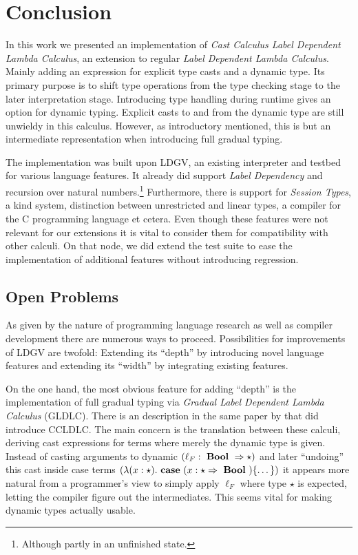 \chapter{Conclusion}\label{chap:conclusion}

In this work we presented an implementation of \emph{Cast Calculus Label Dependent Lambda Calculus}, an extension to regular \emph{Label Dependent Lambda Calculus}. Mainly adding an expression for explicit type casts and a dynamic type. Its primary purpose is to shift type operations from the type checking stage to the later interpretation stage. Introducing type handling during runtime gives an option for dynamic typing. Explicit casts to and from the dynamic type are still unwieldy in this calculus. However, as introductory mentioned, this is but an intermediate representation when introducing full gradual typing.

The implementation was built upon LDGV, an existing interpreter and testbed for various language features. It already did support \emph{Label Dependency} and recursion over natural numbers.\footnote{Although partly in an unfinished state.} Furthermore, there is support for \emph{Session Types}, a kind system, distinction between unrestricted and linear types, a compiler for the C programming language et cetera. Even though these features were not relevant for our extensions it is vital to consider them for compatibility with other calculi. On that node, we did extend the test suite to ease the implementation of additional features without introducing regression.

\section{Open Problems}

As given by the nature of programming language research as well as compiler development there are numerous ways to proceed. Possibilities for improvements of LDGV are twofold: Extending its ``depth'' by introducing novel language features and extending its ``width'' by integrating existing features.

On the one hand, the most obvious feature for adding ``depth'' is the implementation of full gradual typing via \emph{Gradual Label Dependent Lambda Calculus} (GLDLC). There is an description in the same paper by \cite{fu2021} that did introduce CCLDLC. The main concern is the translation between these calculi, deriving cast expressions for terms where merely the dynamic type is given. Instead of casting arguments to dynamic $(\ell_F: \text{ \textbf{Bool} } \Rightarrow \star)$ and later ``undoing'' this cast inside case terms $(\lambda(x:\star) . \text{ \textbf{case} } (x : \star \Rightarrow \text{ \textbf{Bool} }) \{\dots\})$ it appears more natural from a programmer's view to simply apply $\ell_F$ where type $\star$ is expected, letting the compiler figure out the intermediates. This seems vital for making dynamic types actually usable.

